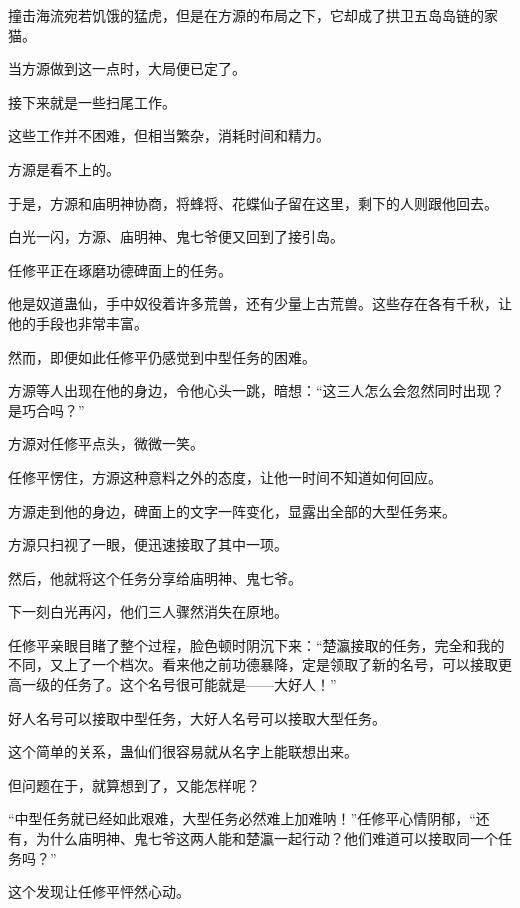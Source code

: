 
\begin{this_body}



撞击海流宛若饥饿的猛虎，但是在方源的布局之下，它却成了拱卫五岛岛链的家猫。

当方源做到这一点时，大局便已定了。

接下来就是一些扫尾工作。

这些工作并不困难，但相当繁杂，消耗时间和精力。

方源是看不上的。

于是，方源和庙明神协商，将蜂将、花蝶仙子留在这里，剩下的人则跟他回去。

白光一闪，方源、庙明神、鬼七爷便又回到了接引岛。

任修平正在琢磨功德碑面上的任务。

他是奴道蛊仙，手中奴役着许多荒兽，还有少量上古荒兽。这些存在各有千秋，让他的手段也非常丰富。

然而，即便如此任修平仍感觉到中型任务的困难。

方源等人出现在他的身边，令他心头一跳，暗想：“这三人怎么会忽然同时出现？是巧合吗？”

方源对任修平点头，微微一笑。

任修平愣住，方源这种意料之外的态度，让他一时间不知道如何回应。

方源走到他的身边，碑面上的文字一阵变化，显露出全部的大型任务来。

方源只扫视了一眼，便迅速接取了其中一项。

然后，他就将这个任务分享给庙明神、鬼七爷。

下一刻白光再闪，他们三人骤然消失在原地。

任修平亲眼目睹了整个过程，脸色顿时阴沉下来：“楚瀛接取的任务，完全和我的不同，又上了一个档次。看来他之前功德暴降，定是领取了新的名号，可以接取更高一级的任务了。这个名号很可能就是——大好人！”

好人名号可以接取中型任务，大好人名号可以接取大型任务。

这个简单的关系，蛊仙们很容易就从名字上能联想出来。

但问题在于，就算想到了，又能怎样呢？

“中型任务就已经如此艰难，大型任务必然难上加难呐！”任修平心情阴郁，“还有，为什么庙明神、鬼七爷这两人能和楚瀛一起行动？他们难道可以接取同一个任务吗？”

这个发现让任修平怦然心动。


\end{this_body}
